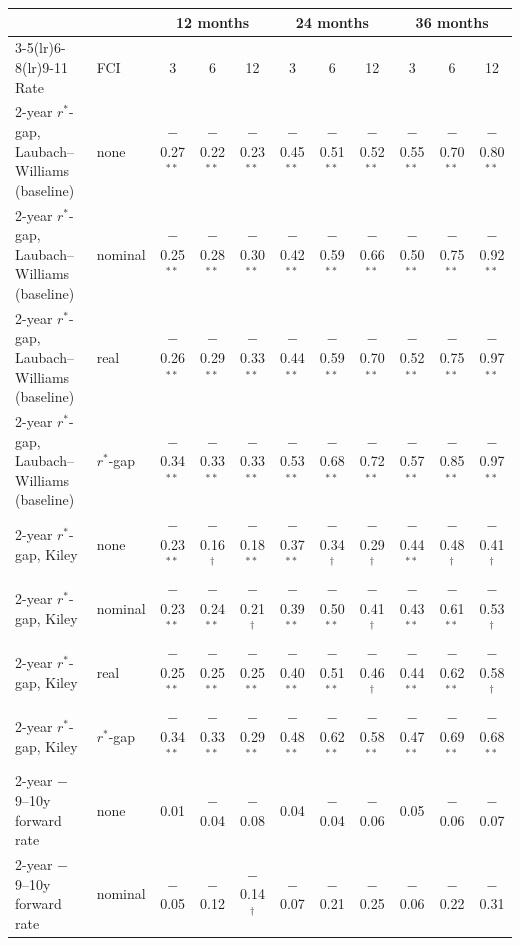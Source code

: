 \begin{tabular}{llccccccccc}
\toprule
 & & \multicolumn{3}{c}{12 months} & \multicolumn{3}{c}{24 months} & \multicolumn{3}{c}{36 months}\\
\cmidrule(lr){3-5}\cmidrule(lr){6-8}\cmidrule(lr){9-11}
Rate & FCI & 3 & 6 & 12 & 3 & 6 & 12 & 3 & 6 & 12 \\
\midrule
2-year $r^*$-gap, Laubach--Williams (baseline) & none & $-$0.27$^{**}$ & $-$0.22$^{**}$ & $-$0.23$^{**}$ & $-$0.45$^{**}$ & $-$0.51$^{**}$ & $-$0.52$^{**}$ & $-$0.55$^{**}$ & $-$0.70$^{**}$ & $-$0.80$^{**}$ \\
2-year $r^*$-gap, Laubach--Williams (baseline) & nominal & $-$0.25$^{**}$ & $-$0.28$^{**}$ & $-$0.30$^{**}$ & $-$0.42$^{**}$ & $-$0.59$^{**}$ & $-$0.66$^{**}$ & $-$0.50$^{**}$ & $-$0.75$^{**}$ & $-$0.92$^{**}$ \\
2-year $r^*$-gap, Laubach--Williams (baseline) & real & $-$0.26$^{**}$ & $-$0.29$^{**}$ & $-$0.33$^{**}$ & $-$0.44$^{**}$ & $-$0.59$^{**}$ & $-$0.70$^{**}$ & $-$0.52$^{**}$ & $-$0.75$^{**}$ & $-$0.97$^{**}$ \\
2-year $r^*$-gap, Laubach--Williams (baseline) & $r^*$-gap & $-$0.34$^{**}$ & $-$0.33$^{**}$ & $-$0.33$^{**}$ & $-$0.53$^{**}$ & $-$0.68$^{**}$ & $-$0.72$^{**}$ & $-$0.57$^{**}$ & $-$0.85$^{**}$ & $-$0.97$^{**}$ \\
\midrule
2-year $r^*$-gap, Kiley & none & $-$0.23$^{**}$ & $-$0.16$^{\dagger}$ & $-$0.18$^{**}$ & $-$0.37$^{**}$ & $-$0.34$^{\dagger}$ & $-$0.29$^{\dagger}$ & $-$0.44$^{**}$ & $-$0.48$^{\dagger}$ & $-$0.41$^{\dagger}$ \\
2-year $r^*$-gap, Kiley & nominal & $-$0.23$^{**}$ & $-$0.24$^{**}$ & $-$0.21$^{\dagger}$ & $-$0.39$^{**}$ & $-$0.50$^{**}$ & $-$0.41$^{\dagger}$ & $-$0.43$^{**}$ & $-$0.61$^{**}$ & $-$0.53$^{\dagger}$ \\
2-year $r^*$-gap, Kiley & real & $-$0.25$^{**}$ & $-$0.25$^{**}$ & $-$0.25$^{**}$ & $-$0.40$^{**}$ & $-$0.51$^{**}$ & $-$0.46$^{\dagger}$ & $-$0.44$^{**}$ & $-$0.62$^{**}$ & $-$0.58$^{\dagger}$ \\
2-year $r^*$-gap, Kiley & $r^*$-gap & $-$0.34$^{**}$ & $-$0.33$^{**}$ & $-$0.29$^{**}$ & $-$0.48$^{**}$ & $-$0.62$^{**}$ & $-$0.58$^{**}$ & $-$0.47$^{**}$ & $-$0.69$^{**}$ & $-$0.68$^{**}$ \\
\midrule
2-year $-$ 9--10y forward rate & none & 0.01 & $-$0.04 & $-$0.08 & 0.04 & $-$0.04 & $-$0.06 & 0.05 & $-$0.06 & $-$0.07 \\
2-year $-$ 9--10y forward rate & nominal & $-$0.05 & $-$0.12 & $-$0.14$^{\dagger}$ & $-$0.07 & $-$0.21 & $-$0.25 & $-$0.06 & $-$0.22 & $-$0.31 \\

\end{tabular}
